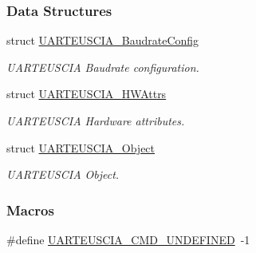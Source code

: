 \subsubsection*{Data Structures}
\begin{DoxyCompactItemize}
\item 
struct \hyperlink{struct_u_a_r_t_e_u_s_c_i_a___baudrate_config}{U\-A\-R\-T\-E\-U\-S\-C\-I\-A\-\_\-\-Baudrate\-Config}
\begin{DoxyCompactList}\small\item\em U\-A\-R\-T\-E\-U\-S\-C\-I\-A Baudrate configuration. \end{DoxyCompactList}\item 
struct \hyperlink{struct_u_a_r_t_e_u_s_c_i_a___h_w_attrs}{U\-A\-R\-T\-E\-U\-S\-C\-I\-A\-\_\-\-H\-W\-Attrs}
\begin{DoxyCompactList}\small\item\em U\-A\-R\-T\-E\-U\-S\-C\-I\-A Hardware attributes. \end{DoxyCompactList}\item 
struct \hyperlink{struct_u_a_r_t_e_u_s_c_i_a___object}{U\-A\-R\-T\-E\-U\-S\-C\-I\-A\-\_\-\-Object}
\begin{DoxyCompactList}\small\item\em U\-A\-R\-T\-E\-U\-S\-C\-I\-A Object. \end{DoxyCompactList}\end{DoxyCompactItemize}
\subsubsection*{Macros}
\begin{DoxyCompactItemize}
\item 
\#define \hyperlink{_u_a_r_t_e_u_s_c_i_a_8h_aafc145e68f11619b59d9790a5acc9831}{U\-A\-R\-T\-E\-U\-S\-C\-I\-A\-\_\-\-C\-M\-D\-\_\-\-U\-N\-D\-E\-F\-I\-N\-E\-D}~-\/1
\end{DoxyCompactItemize}
